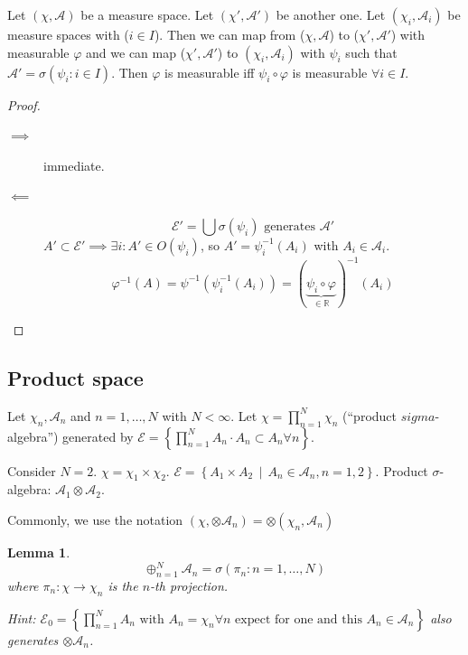 \documentclass[a4paper]{article}
\newcounter{lecref}[section]
\numberwithin{lecref}{section}
\theoremstyle{break}
\newtheorem{lemma}[lecref]{Lemma}
\newcommand{\Set}[1]{\left\{#1\right\}}
\newcommand{\SetDef}[2]{\left\{#1\,\mid\,#2\right\}}
\begin{document}
\begin{theorem}
  \label{thm-maps}
  Let $(\chi, \mathcal A)$ be a measure space. Let $(\chi', \mathcal A')$ be another one.
  Let $(\chi_i, \mathcal A_i)$ be measure spaces with ($i \in I$). %
  Then we can map from ($\chi, \mathcal A$) to ($\chi', \mathcal A'$) with measurable $\varphi$ and we can map ($\chi', \mathcal A'$) to $(\chi_i, \mathcal A_i)$ with $\psi_i$ such that $\mathcal A' = \sigma(\psi_i: i \in I)$. Then $\varphi$ is measurable iff $\psi_i \circ \varphi$ is measurable $\forall i \in I$.
\end{theorem}

\begin{proof}
  \begin{description}
    \item[$\implies$]
      immediate.
    \item[$\impliedby$]
      \[ \mathcal E' = \bigcup \sigma(\psi_i) \text{ generates $\mathcal A'$} \]
      $A' \subset \mathcal E' \implies \exists i: A' \in O(\psi_i)$, so $A' = \psi_i^{-1}(A_i)$ with $A_i \in \mathcal A_i$.
      \[ \varphi^{-1}(A) = \psi^{-1}(\psi_i^{-1}(A_i)) = (\underbrace{\psi_i \circ \varphi}_{\in \mathbb R})^{-1} (A_i)  \]
  \end{description}
\end{proof}

\subsection{Product space}

Let $\chi_n, \mathcal A_n$ and $n = 1, \dots, N$ with $N < \infty$.
Let $\chi = \prod_{n=1}^N \chi_n$ (\enquote{product $sigma$-algebra})
generated by $\mathcal E = \Set{\prod_{n=1}^N A_n \cdot A_n \subset A_n \forall n}$.

Consider $N = 2$. $\chi = \chi_1 \times \chi_2$. $\mathcal E = \SetDef{A_1 \times A_2}{A_n \in \mathcal A_n, n = 1, 2}$.
Product $\sigma$-algebra: $\mathcal A_1 \otimes \mathcal A_2$.

Commonly, we use the notation $(\chi, \otimes \mathcal A_n) = \otimes(\chi_n, \mathcal A_n)$

\begin{lemma}
  \[ \oplus_{n=1}^N \mathcal A_n = \sigma\left(\pi_n: n = 1, \dots, N\right) \]
  where $\pi_n: \chi \to \chi_n$ is the $n$-th projection.

  Hint: $\mathcal E_0 = \Set{\prod_{n=1}^N A_n \text{ with } A_n = \chi_n \forall n \text{ expect for one and this } A_n \in \mathcal A_n}$ also generates $\otimes \mathcal A_n$.
\end{lemma}
\end{document}
